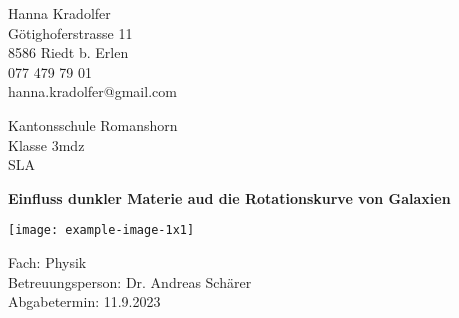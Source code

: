 
\begin{titlepage}
	\clearpage\thispagestyle{empty}	
	
	\begin{minipage}[t]{\textwidth}
		\begin{minipage}[t]{0.5\textwidth}
			Hanna Kradolfer\\
			Götighoferstrasse 11\\
			8586 Riedt b. Erlen\\
			077 479 79 01\\
			hanna.kradolfer@gmail.com
		\end{minipage}
		\begin{minipage}[t]{0.5\textwidth}
			\begin{flushright}
				Kantonsschule Romanshorn\\
				Klasse 3mdz\\
				SLA
			\end{flushright}
		\end{minipage}
	\end{minipage}
	
	\vspace{4cm}
	
	{
		\centering
		\Huge\bfseries Einfluss dunkler Materie aud die Rotationskurve von Galaxien\par
		\vspace{1cm}
		\texttt{[image: example-image-1x1]}\par
	}
	
	\vspace{9cm}	
	\noindent
	Fach: Physik \noindent\\
	Betreuungsperson: Dr. Andreas Schärer\\
	Abgabetermin: 11.9.2023
	
\end{titlepage}
